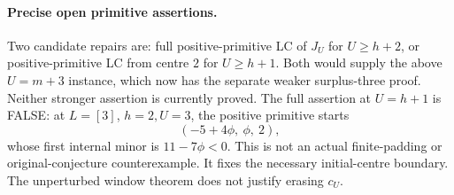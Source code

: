 \paragraph{Precise open primitive assertions.}
Two candidate repairs are: full positive-primitive LC of $J_U$ for
$U\ge h+2$, or positive-primitive LC from centre $2$ for $U\ge h+1$.
Both would supply the above $U=m+3$ instance, which now has the
separate weaker surplus-three proof. Neither stronger assertion is
currently proved. The full assertion at $U=h+1$ is FALSE: at
$L=[3]$, $h=2,U=3$, the positive primitive starts
\[
             (-5+4\phi,\ \phi,\ 2),
\]
whose first internal minor is $11-7\phi<0$.
This is not an actual finite-padding or original-conjecture
counterexample. It fixes the necessary initial-centre boundary.
The unperturbed window theorem does not justify erasing $c_U$.
